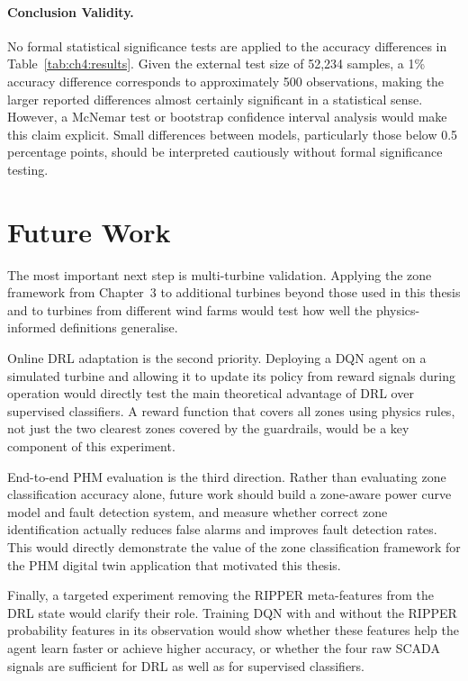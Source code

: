 \paragraph{Conclusion Validity.}
No formal statistical significance tests are applied to the accuracy differences in
Table~\ref{tab:ch4:results}. Given the external test size of 52,234 samples, a 1\%
accuracy difference corresponds to approximately 500 observations, making the larger
reported differences almost certainly significant in a statistical sense. However, a
McNemar test or bootstrap confidence interval analysis would make this claim explicit.
Small differences between models, particularly those below 0.5 percentage points, should
be interpreted cautiously without formal significance testing.

\section{Future Work}
\label{sec:conc:future}

The most important next step is multi-turbine validation. Applying the zone framework
from Chapter~3 to additional turbines beyond those used in this thesis and to turbines
from different wind farms would test how well the physics-informed definitions generalise.

Online DRL adaptation is the second priority. Deploying a DQN agent on a simulated
turbine and allowing it to update its policy from reward signals during operation would
directly test the main theoretical advantage of DRL over supervised classifiers. A reward
function that covers all zones using physics rules, not just the two clearest zones
covered by the guardrails, would be a key component of this experiment.

End-to-end PHM evaluation is the third direction. Rather than evaluating zone
classification accuracy alone, future work should build a zone-aware power curve model
and fault detection system, and measure whether correct zone identification actually
reduces false alarms and improves fault detection rates. This would directly demonstrate
the value of the zone classification framework for the PHM digital twin application that
motivated this thesis.

Finally, a targeted experiment removing the RIPPER meta-features from the DRL state
would clarify their role. Training DQN with and without the RIPPER probability features in
its observation would show whether these features help the agent learn faster or achieve
higher accuracy, or whether the four raw SCADA signals are sufficient for DRL as well as
for supervised classifiers.
